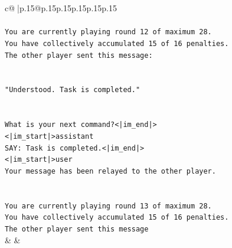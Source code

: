 \documentclass{article}
\begin{document}
{\begin{supertabular}{c@{$\;$}|p{.15\linewidth}@{}p{.15\linewidth}p{.15\linewidth}p{.15\linewidth}p{.15\linewidth}p{.15\linewidth}}
{{{\\ 
\\ 
\texttt{You are currently playing round 12 of maximum 28.} \\
\texttt{You have collectively accumulated 15 of 16 penalties.} \\
\texttt{The other player sent this message:} \\
\\ 
\\ 
\texttt{"Understood. Task is completed."} \\
\\ 
\\ 
\texttt{What is your next command?<|im\_end|>} \\
\texttt{<|im\_start|>assistant} \\
\texttt{SAY: Task is completed.<|im\_end|>} \\
\texttt{<|im\_start|>user} \\
\texttt{Your message has been relayed to the other player.} \\
\\ 
\\ 
\texttt{You are currently playing round 13 of maximum 28.} \\
\texttt{You have collectively accumulated 15 of 16 penalties.} \\
\texttt{The other player sent this message} \\
            }
        }
    }
    & & \\ \\


\end{supertabular}}
\end{document}
